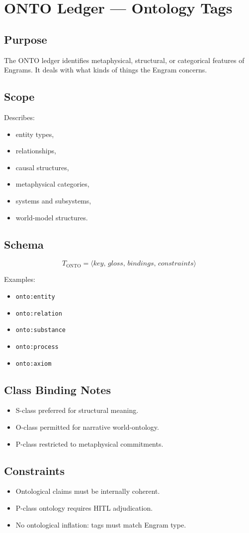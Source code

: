 \chapter{ONTO Ledger --- Ontology Tags}
\label{chap:ONTO_Ledger}

\section{Purpose}

The ONTO ledger identifies metaphysical, structural, or categorical features of
Engrams. It deals with what kinds of things the Engram concerns.

\section{Scope}

Describes:
\begin{itemize}
    \item entity types,
    \item relationships,
    \item causal structures,
    \item metaphysical categories,
    \item systems and subsystems,
    \item world-model structures.
\end{itemize}

\section{Schema}

\[
T_{\text{ONTO}} = \langle key,\, gloss,\, bindings,\, constraints \rangle
\]

Examples:
\begin{itemize}
    \item \texttt{onto:entity}
    \item \texttt{onto:relation}
    \item \texttt{onto:substance}
    \item \texttt{onto:process}
    \item \texttt{onto:axiom}
\end{itemize}

\section{Class Binding Notes}

\begin{itemize}
    \item S-class preferred for structural meaning.
    \item O-class permitted for narrative world-ontology.
    \item P-class restricted to metaphysical commitments.
\end{itemize}

\section{Constraints}

\begin{itemize}
    \item Ontological claims must be internally coherent.
    \item P-class ontology requires HITL adjudication.
    \item No ontological inflation: tags must match Engram type.
\end{itemize}
